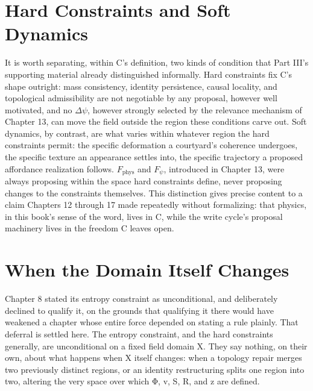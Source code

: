 \section{Hard Constraints and Soft Dynamics}

It is worth separating, within C's definition, two kinds of condition that Part III's supporting material already distinguished informally. Hard constraints fix C's shape outright: mass consistency, identity persistence, causal locality, and topological admissibility are not negotiable by any proposal, however well motivated, and no \(\Delta\psi\), however strongly selected by the relevance mechanism of Chapter 13, can move the field outside the region these conditions carve out. Soft dynamics, by contrast, are what varies within whatever region the hard constraints permit: the specific deformation a courtyard's coherence undergoes, the specific texture an appearance settles into, the specific trajectory a proposed affordance realization follows. \(F_{\mathrm{phys}}\) and \(F_\psi\), introduced in Chapter 13, were always proposing within the space hard constraints define, never proposing changes to the constraints themselves. This distinction gives precise content to a claim Chapters 12 through 17 made repeatedly without formalizing: that physics, in this book's sense of the word, lives in C, while the write cycle's proposal machinery lives in the freedom C leaves open.

\section{When the Domain Itself Changes}

Chapter 8 stated its entropy constraint as unconditional, and deliberately declined to qualify it, on the grounds that qualifying it there would have weakened a chapter whose entire force depended on stating a rule plainly. That deferral is settled here. The entropy constraint, and the hard constraints generally, are unconditional on a fixed field domain X. They say nothing, on their own, about what happens when X itself changes: when a topology repair merges two previously distinct regions, or an identity restructuring splits one region into two, altering the very space over which Φ, v, S, R, and z are defined.

